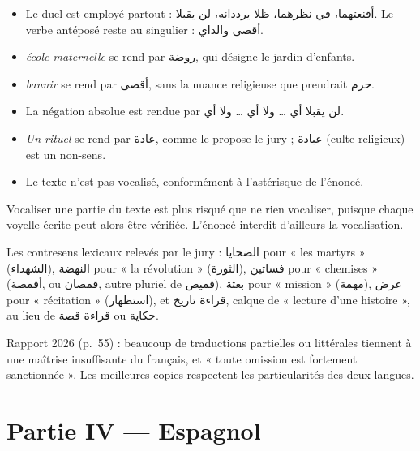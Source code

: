 \documentclass[11pt,a4paper]{article}
\providecommand{\tightlist}{\setlength{\itemsep}{0pt}\setlength{\parskip}{0pt}}
\begin{document}
\begin{itemize}
\tightlist
\item
  Le duel est employé partout : أقنعتهما، في نظرهما، ظلا يرددانه، لن يقبلا. Le verbe antéposé reste au singulier : أقصى والداي.
\item
  \emph{école maternelle} se rend par روضة, qui désigne le jardin d'enfants.
\item
  \emph{bannir} se rend par أقصى, sans la nuance religieuse que prendrait حرم.
\item
  La négation absolue est rendue par لن يقبلا أي \ldots{} ولا أي \ldots{} ولا أي.
\item
  \emph{Un rituel} se rend par عادة, comme le propose le jury ; عبادة (culte religieux) est un non-sens.
\item
  Le texte n'est pas vocalisé, conformément à l'astérisque de l'énoncé.
\end{itemize}

\begin{piege}

Vocaliser une partie du texte est plus risqué que ne rien vocaliser, puisque chaque voyelle écrite peut alors être vérifiée. L'énoncé interdit d'ailleurs la vocalisation.

\end{piege}

\begin{piege}

Les contresens lexicaux relevés par le jury : الضحايا pour « les martyrs » (الشهداء), النهضة pour « la révolution » (الثورة), فساتين pour « chemises » (أقمصة, ou قمصان, autre pluriel de قميص), بعثة pour « mission » (مهمة), عرض pour « récitation » (استظهار), et قراءة تاريخ, calque de « lecture d'une histoire », au lieu de قراءة قصة ou حكاية.

\end{piege}

\begin{jury}

Rapport 2026 (p.~55) : beaucoup de traductions partielles ou littérales tiennent à une maîtrise insuffisante du français, et « toute omission est fortement sanctionnée ». Les meilleures copies respectent les particularités des deux langues.

\end{jury}

\hypertarget{partie-iv-espagnol}{%
\section{Partie IV --- Espagnol}\label{partie-iv-espagnol}}
\end{document}
